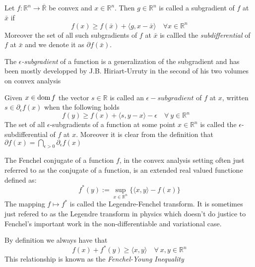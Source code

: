 %
\begin{definition}
	Let $f: \mathbb R^n \longrightarrow \overline{\mathbb R}$ be convex and
	$x\in\mathbb R^n$. Then $g\in\mathbb R^n$ is called a subgradient of
	$f$ at $\bar x$ if 
	\begin{equation*}
		f(x) \geq f(\bar x) +\langle g,x-\bar x\rangle \quad 
		\forall x\in\mathbb R^n 
	\end{equation*}
	Moreover the set of all such subgradients of $f$ at $\bar x$ is callled
	the \emph{subdifferential} of $f$ at $\bar x$ and we denote it as
	$\partial f(\bar x)$.
\end{definition}
%
The  \emph{$\epsilon$-subgradient} of a function is a generalization 
of the subgradient and  has been mostly developped by J.B. Hiriart-Urruty
in the second of his two volumes on convex analysis
\autocite[92]{hiriart1993convex} 
\begin{definition} 
	Given $x\in\mathrm{dom} \, f$ the vector $s\in \mathbb R$ is called
	an $\epsilon-subgradient$ of $f$ at $x$, written $s\in
	\partial_\epsilon f(x)$ when the following holds
	\begin{equation*}
		f(y) \geq f(x) + \langle s,y-x\rangle -\epsilon 
		\quad \forall \ y \in \mathbb R^n \quad
	\end{equation*}
The set of all $\epsilon$-subgradients of a function at some point
$x\in\mathbb R^n$ is called the $\epsilon$-subdifferential of $f$ at $x$.
Moreover it is clear from the definition that
$\partial f(x) = \bigcap_{\epsilon>0}\partial_{\epsilon}f(x)$
\end{definition}
%
\begin{definition}
The Fenchel conjugate of a function $f$, in the convex analysis setting often
just referred to as the conjugate of a function, is an extended real valued
functione defined as:
\begin{equation*}
	f^*(y) := \sup_{x\in\mathbb R^n}\{\langle x,y\rangle - f(x)\}
\end{equation*}
The mapping $f\mapsto f^*$ is called the Legendre-Fenchel transform.
It is sometimes just refered to as the Legendre transform in physics which 
doesn't do justice to Fenchel's important work in the non-differentiable
and variational case.
\end{definition}
\noindent By definition we always have that
\begin{equation*} f(x)+f^*(y)\geq\langle x,y\rangle \quad \forall\ x,y\in 
\mathbb R^n\end{equation*}
This relationship is known as the \emph{Fenchel-Young Inequality}



